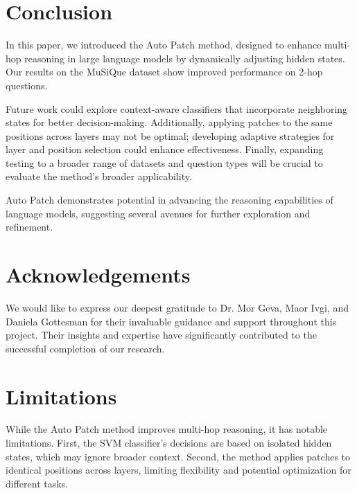 \documentclass[11pt]{article}
\begin{document}
\section{Conclusion}
In this paper, we introduced the Auto Patch method, designed to enhance multi-hop reasoning in large language models by dynamically adjusting hidden states. Our results on the MuSiQue dataset show improved performance on 2-hop questions.

Future work could explore context-aware classifiers that incorporate neighboring states for better decision-making. Additionally, applying patches to the same positions across layers may not be optimal; developing adaptive strategies for layer and position selection could enhance effectiveness. Finally, expanding testing to a broader range of datasets and question types will be crucial to evaluate the method’s broader applicability.

Auto Patch demonstrates potential in advancing the reasoning capabilities of language models, suggesting several avenues for further exploration and refinement.


\section*{Acknowledgements}

We would like to express our deepest gratitude to Dr. Mor Geva, Maor Ivgi, and Daniela Gottesman for their invaluable guidance and support throughout this project. Their insights and expertise have significantly contributed to the successful completion of our research.

\section*{Limitations}
While the Auto Patch method improves multi-hop reasoning, it has notable limitations. First, the SVM classifier's decisions are based on isolated hidden states, which may ignore broader context. Second, the method applies patches to identical positions across layers, limiting flexibility and potential optimization for different tasks.




\end{document}

